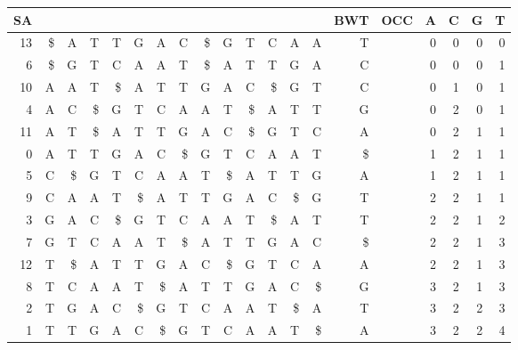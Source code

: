\documentclass{article}
\begin{document}
\begin{table}
\begin{tabular}{|r|>{\columncolor[gray]{0.8}}r|rrrrrrrrrrrr|>{\columncolor[gray]{0.8}}r| r |rrrr|}
\hline
SA & &  &   &   &   &   &   &   &   &   &   &   &   &    BWT & OCC & A & C & G & T \\
\hline
13 & \$ & A & T & T & G & A & C & \$ & G & T & C & A & A & T&&0&0&0&0\\
6 & \$ & G & T & C & A & A & T & \$ & A & T & T & G & A & C&&0&0&0&1\\
 \hline
10 & A & A & T & \$ & A & T & T & G & A & C & \$ & G & T & C&&0&1&0&1\\
4 & A & C & \$ & G & T & C & A & A & T & \$ & A & T & T & G&&0&2&0&1\\
11 & A & T & \$ & A & T & T & G & A & C & \$ & G & T & C & A&&0&2&1&1\\
0 & A & T & T & G & A & C & \$ & G & T & C & A & A & T & \$&&1&2&1&1\\
 \hline
5 & C & \$ & G & T & C & A & A & T & \$ & A & T & T & G & A&&1&2&1&1\\
9 & C & A & A & T & \$ & A & T & T & G & A & C & \$ & G & T&&2&2&1&1\\
 \hline
3 & G & A & C & \$ & G & T & C & A & A & T & \$ & A & T & T&&2&2&1&2\\
7 & G & T & C & A & A & T & \$ & A & T & T & G & A & C & \$&&2&2&1&3\\
 \hline
12 & T & \$ & A & T & T & G & A & C & \$ & G & T & C & A & A&&2&2&1&3\\
8 & T & C & A & A & T & \$ & A & T & T & G & A & C & \$ & G&&3&2&1&3\\
2 & T & G & A & C & \$ & G & T & C & A & A & T & \$ & A & T&&3&2&2&3\\
1 & T & T & G & A & C & \$ & G & T & C & A & A & T & \$ & A&&3&2&2&4\\
 \hline
\end{tabular}\end{table}
\end{document}

